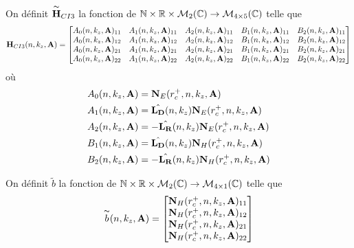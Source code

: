     \begin{defn}
      On définit \(\overset{\thicksim}{\mathbf{H}}_{CI3}\) la fonction de \(\mathbb N \times \mathbb R \times \mathcal{M}_2(\mathbb C) \rightarrow \mathcal{M}_{4\times5}(\mathbb C)\) telle que
      \begin{equation*}
        \mathbf{H}_{CI3}(n,k_z,\mathbf{A}) = 
        \begin{bmatrix}
          A_0(n,k_z,\mathbf{A})_{11} & A_1(n,k_z,\mathbf{A})_{11} & A_2(n,k_z,\mathbf{A})_{11} & B_1(n,k_z,\mathbf{A})_{11} & B_2(n,k_z,\mathbf{A})_{11}
          \\
          A_0(n,k_z,\mathbf{A})_{12} & A_1(n,k_z,\mathbf{A})_{12} & A_2(n,k_z,\mathbf{A})_{12} & B_1(n,k_z,\mathbf{A})_{12} & B_2(n,k_z,\mathbf{A})_{12}
          \\
          A_0(n,k_z,\mathbf{A})_{21} & A_1(n,k_z,\mathbf{A})_{21} & A_2(n,k_z,\mathbf{A})_{21} & B_1(n,k_z,\mathbf{A})_{21} & B_2(n,k_z,\mathbf{A})_{21}
          \\
          A_0(n,k_z,\mathbf{A})_{22} & A_1(n,k_z,\mathbf{A})_{22} & A_2(n,k_z,\mathbf{A})_{22} & B_1(n,k_z,\mathbf{A})_{22} & B_2(n,k_z,\mathbf{A})_{22}
        \end{bmatrix}
        \end{equation*}
        où
        \begin{align*}
          A_0(n,k_z,\mathbf{A}) &= \mathbf{N}_E(r_c^+,n,k_z,\mathbf{A})
          \\
          A_1(n,k_z,\mathbf{A}) &= \hat{\mathbf{L_D}}(n,k_z)\mathbf{N}_E(r_c^+,n,k_z,\mathbf{A})
          \\
          A_2(n,k_z,\mathbf{A}) &= -\hat{\mathbf{L_R}}(n,k_z)\mathbf{N}_E(r_c^+,n,k_z,\mathbf{A})
          \\
          B_1(n,k_z,\mathbf{A}) &= \hat{\mathbf{L_D}}(n,k_z)\mathbf{N}_H(r_c^+,n,k_z,\mathbf{A})
          \\
          B_2(n,k_z,\mathbf{A}) &= -\hat{\mathbf{L_R}}(n,k_z)\mathbf{N}_H(r_c^+,n,k_z,\mathbf{A})            
        \end{align*}

        On définit \(\tilde{b}\) la fonction de \(\mathbb N \times \mathbb R \times \mathcal{M}_2(\mathbb C) \rightarrow \mathcal{M}_{4\times1}(\mathbb C)\) telle que
        \begin{equation*}
          \overset{\thicksim}{b}(n,k_z,\mathbf{A}) = 
          \begin{bmatrix}
            \mathbf{N}_H(r_c^+,n,k_z,\mathbf{A})_{11}
            \\
            \mathbf{N}_H(r_c^+,n,k_z,\mathbf{A})_{12}
            \\
            \mathbf{N}_H(r_c^+,n,k_z,\mathbf{A})_{21}
            \\
            \mathbf{N}_H(r_c^+,n,k_z,\mathbf{A})_{22}
          \end{bmatrix}
        \end{equation*}
      \end{defn}

